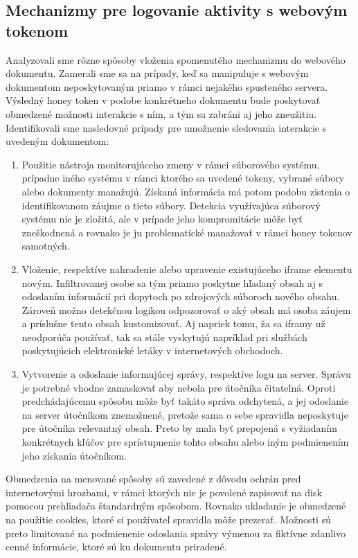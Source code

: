 \documentclass[conference, 11pt,slovak,a4paper,twoside]{IEEEtran}
\begin{document}
\subsection{Mechanizmy pre logovanie aktivity s webovým tokenom} \label{mechanismForLoggingActivity}

Analyzovali sme rôzne spôsoby vloženia spomenutého mechanizmu do webového dokumentu. Zamerali sme sa na prípady, keď sa manipuluje s webovým dokumentom neposkytovaným priamo v rámci nejakého spusteného servera. Výsledný honey token v podobe konkrétneho dokumentu bude poskytovať obmedzené možnosti interakcie s ním, a tým sa zabráni aj jeho zneužitiu. Identifikovali sme nasledovné prípady pre umožnenie sledovania interakcie s uvedeným dokumentom:

\begin{enumerate}
	\item Použitie nástroja monitorujúceho zmeny v rámci súborového systému, prípadne iného systému v rámci ktorého sa uvedené tokeny, vybrané súbory alebo dokumenty manažujú. Získaná informácia má potom podobu zistenia o identifikovanom záujme o tieto súbory. Detekcia využívajúca súborový systému nie je zložitá, ale v prípade jeho kompromitácie môže byť zneškodnená a rovnako je ju problematické manažovať v rámci honey tokenov samotných.
	
	\item Vloženie, respektíve nahradenie alebo upravenie existujúceho iframe elementu novým. Infiltrovanej osobe sa tým priamo poskytne hľadaný obsah aj s odoslaním informácií pri dopytoch po zdrojových súboroch nového obsahu. Zároveň možno detekčnou logikou odpozorovať o aký obsah má osoba záujem a príslušne tento obsah kustomizovať. Aj napriek tomu, ža sa iframy už neodporúča používať, tak sa stále vyskytujú napríklad pri službách poskytujúcich elektronické letáky v internetových obchodoch.

	\item Vytvorenie a odoslanie informujúcej správy, respektíve logu na server. Správu je potrebné vhodne zamaskovať aby nebola pre útočníka čitateľná. Oproti predchádajúcemu spôsobu môže byť takáto správa odchytená, a jej odoslanie na server útočníkom znemožnené, pretože sama o sebe spravidla neposkytuje pre útočníka relevantný obsah. Preto by mala byť prepojená s vyžiadaním konkrétnych kľúčov pre sprístupnenie tohto obsahu alebo iným podmienením jeho získania útočníkom. 
\end{enumerate}
 
Obmedzenia na menované spôsoby sú zavedené z dôvodu ochrán pred internetovými hrozbami, v rámci ktorých nie je povolené zapisovať na disk pomocou prehliadača štandardným spôsobom. Rovnako ukladanie je obmedzené na použitie cookies, ktoré si používateľ spravidla môže prezerať. Možnosti sú preto limitované na podmienenie odoslania správy výmenou za fiktívne zdanlivo cenné informácie, ktoré sú ku dokumentu priradené.
  
\end{document}

